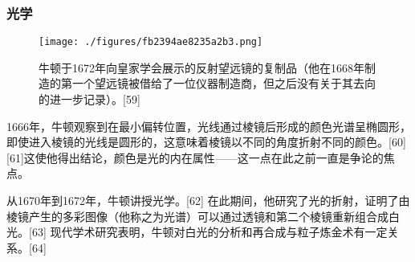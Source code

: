 \subsubsection{光学}
\begin{figure}[ht]
\centering
\texttt{[image: ./figures/fb2394ae8235a2b3.png]}
\caption{牛顿于1672年向皇家学会展示的反射望远镜的复制品（他在1668年制造的第一个望远镜被借给了一位仪器制造商，但之后没有关于其去向的进一步记录）。[59]} \label{fig_Newton_3}
\end{figure}
1666年，牛顿观察到在最小偏转位置，光线通过棱镜后形成的颜色光谱呈椭圆形，即使进入棱镜的光线是圆形的，这意味着棱镜以不同的角度折射不同的颜色。[60][61]这使他得出结论，颜色是光的内在属性——这一点在此之前一直是争论的焦点。

从1670年到1672年，牛顿讲授光学。[62] 在此期间，他研究了光的折射，证明了由棱镜产生的多彩图像（他称之为光谱）可以通过透镜和第二个棱镜重新组合成白光。[63] 现代学术研究表明，牛顿对白光的分析和再合成与粒子炼金术有一定关系。[64] 